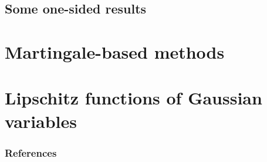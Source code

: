 \documentclass[10pt,handout,english]{beamer}
\begin{document}
\subsection{Some one-sided results}

\section{Martingale-based methods}
\frame{\tableofcontents[currentsection]}

\section{Lipschitz functions of Gaussian variables}
\frame{\tableofcontents[currentsection]}





\begin{frame}[allowframebreaks]
\frametitle{References}


\end{frame}
\end{document}
